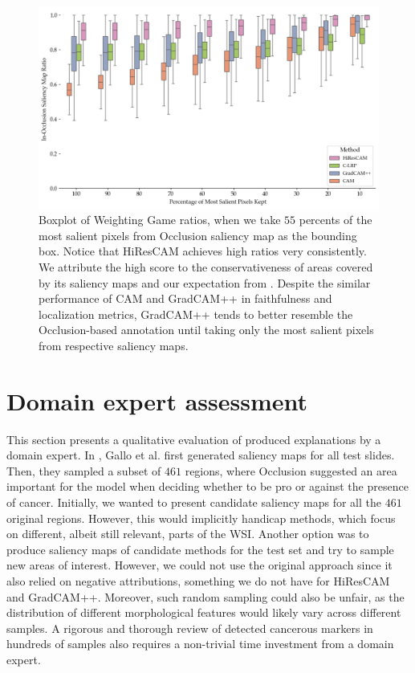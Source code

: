 \begin{figure}
    \begin{center}
    \begin{minipage}{1\textwidth}
      \includegraphics[width=\textwidth]{img/occlusion-weighting-game-boxplot.png}
    \end{minipage}
    \caption{Boxplot of Weighting Game ratios, when we take $55$ percents of the most salient pixels from Occlusion saliency map as the bounding box. Notice that HiResCAM achieves high ratios very consistently. We attribute the high score to the conservativeness of areas covered by its saliency maps and our expectation from . Despite the similar performance of CAM and GradCAM++ in faithfulness and localization metrics, GradCAM++ tends to better resemble the Occlusion-based annotation until taking only the most salient pixels from respective saliency maps.}
    \label{fig:occ-weighting-game-boxplot}
    \end{center}
\end{figure}

\section{Domain expert assessment}

This section presents a qualitative evaluation of produced explanations by a domain expert.
In \cite{gallo}, Gallo et al. first generated saliency maps for all test slides.
Then, they sampled a subset of $461$ regions, where Occlusion suggested an area important for the model when deciding whether to be pro or against the presence of cancer.
Initially, we wanted to present candidate saliency maps for all the $461$ original regions.
However, this would implicitly handicap methods, which focus on different, albeit still relevant, parts of the WSI. 
Another option was to produce saliency maps of candidate methods for the test set and try to sample new areas of interest. However, we could not use the original approach since it also relied on negative attributions, something we do not have for HiResCAM and GradCAM++.
Moreover, such random sampling could also be unfair, as the distribution of different morphological features would likely vary across different samples.
A rigorous and thorough review of detected cancerous markers in hundreds of samples also requires a non-trivial time investment from a domain expert.

